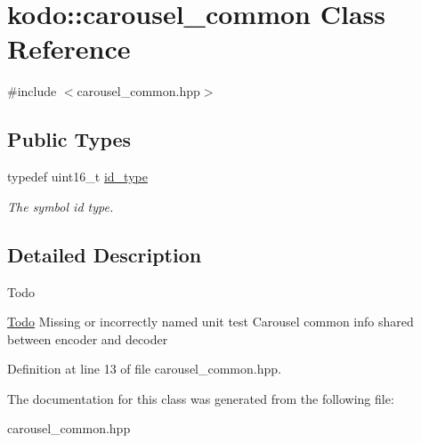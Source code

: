 \hypertarget{classkodo_1_1carousel__common}{\section{kodo\-:\-:carousel\-\_\-common Class Reference}
\label{classkodo_1_1carousel__common}
}


{\ttfamily \#include $<$carousel\-\_\-common.\-hpp$>$}

\subsection*{Public Types}
\begin{DoxyCompactItemize}
\item 
\hypertarget{classkodo_1_1carousel__common_aff8e05bd881924ffbfb317d778ff2de6}{typedef uint16\-\_\-t \hyperlink{classkodo_1_1carousel__common_aff8e05bd881924ffbfb317d778ff2de6}{id\-\_\-type}}\label{classkodo_1_1carousel__common_aff8e05bd881924ffbfb317d778ff2de6}

\begin{DoxyCompactList}\small\item\em The symbol id type. \end{DoxyCompactList}\end{DoxyCompactItemize}


\subsection{Detailed Description}
\begin{DoxyRefDesc}{Todo}
\item[\hyperlink{todo__todo000024}{Todo}]Missing or incorrectly named unit test Carousel common info shared between encoder and decoder \end{DoxyRefDesc}


Definition at line 13 of file carousel\-\_\-common.\-hpp.



The documentation for this class was generated from the following file\-:\begin{DoxyCompactItemize}
\item 
carousel\-\_\-common.\-hpp\end{DoxyCompactItemize}
